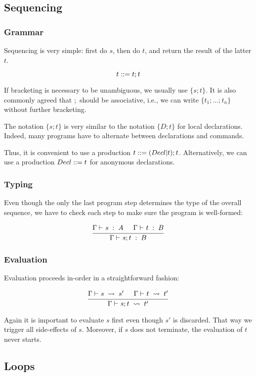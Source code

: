 \subsection{Sequencing}

\subsubsection{Grammar}

Sequencing is very simple: first do $s$, then do $t$, and return the result of the latter $t$.

\[t::= t;t\]

If bracketing is necessary to be unambiguous, we usually use $\{s;t\}$.
It is also commonly agreed that $;$ should be associative, i.e., we can write $\{t_1;\ldots;t_n\}$ without further bracketing.

The notation $\{s;t\}$ is very similar to the notation $\{D;t\}$ for local declarations.
Indeed, many programs have to alternate between declarations and commands.

Thus, it is convenient to use a production $t::= (Decl|t);t$.
Alternatively, we can use a production $Decl ::= t$ for anonymous declarations.

\subsubsection{Typing}

Even though the only the last program step determines the type of the overall sequence, we have to check each step to make sure the program is well-formed:

\[\cfrac{\Gamma\vdash^{}_{}s\;:\;A\hspace*{.5cm} \Gamma\vdash^{}_{}t\;:\;B}{\Gamma\vdash^{}_{}s;t\;:\;B}\,
\]

\subsubsection{Evaluation}

Evaluation proceeds in-order in a straightforward fashion:

\[\cfrac{\Gamma\vdash^{}_{}s\;\rightsquigarrow\;s'\hspace*{.5cm} \Gamma\vdash^{}_{}t\;\rightsquigarrow\;t'}{\Gamma\vdash^{}_{}s;t\;\rightsquigarrow\;t'}\,
\]

Again it is important to evaluate $s$ first even though $s'$ is discarded.
That way we trigger all side-effects of $s$.
Moreover, if $s$ does not terminate, the evaluation of $t$ never starts.

\subsection{Loops}


